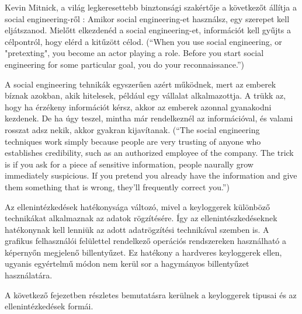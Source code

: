 \documentclass[12pt,a4paper,oneside]{report}
\begin{document}
Kevin Mitnick, a világ legkeresettebb binztonsági szakértője a következőt állítja a social engineering-ről \cite{ghostwires}: Amikor social engineering-et használsz, egy szerepet kell eljátszanod. Mielőtt elkezdenéd a social engineering-et, információt kell gyűjts a célpontról, hogy elérd a kitűzött célod. (``When you use social engineering, or "pretexting", you become an actor playing a role. Before you start social engineering for some particular goal, you do your reconnaissance.'')

A social engineering tehnikák egyszerűen azért működnek, mert az emberek bíznak azokban, akik hitelesek, például egy vállalat alkalmazottja. A trükk az, hogy ha érzékeny információt kérsz, akkor az emberek azonnal gyanakodni kezdenek. De ha úgy teszel, mintha már rendelkeznél az információval, és valami rosszat adsz nekik, akkor gyakran kijavítanak. (``The social engineering techniques work simply because people are very trusting of anyone who establishes credibility, such as an authorized employee of the company. The trick is if you ask for a piece af sensitive information, people naurally grow immediately suspicious. If you pretend you already have the information and give them something that is wrong, they'll frequently correct you.'')

Az ellenintézkedések hatékonysága változó, mivel a keyloggerek különböző technikákat alkalmaznak az adatok rögzítésére. Így az ellenintészkedéseknek hatékonynak kell lenniük az adott adatrögzítési technikával szemben is. A grafikus felhasználói felülettel rendelkező operációs rendszereken használható a képernyőn megjelenő billentyűzet. Ez hatékony a hardveres keyloggerek ellen, ugyanis egyértelmű módon nem kerül sor a hagymányos billentyűzet használatára.

A következő fejezetben részletes bemutatásra kerülnek a keyloggerek tipusai és az ellenintézkedések formái.
\end{document}
